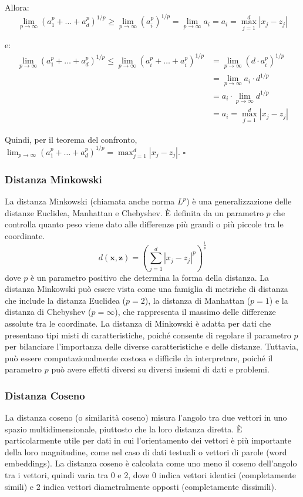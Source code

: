     Allora:
    \[
    \lim_{p \to \infty} (a^p_1 + \ldots + a^p_d)^{1/p} \geq \lim_{p \to \infty} (a^p_i)^{1/p} = \lim_{p \to \infty} a_i = a_i = \max_{j=1}^d |x_j - z_j|
    \]
    
    e:
    \begin{align*}
    \lim_{p \to \infty} (a^p_1 + \ldots + a^p_d)^{1/p} \leq \lim_{p \to \infty} (a^p_i + \ldots + a^p_i)^{1/p} &= \lim_{p \to \infty} (d \cdot a^p_i)^{1/p} \\
    &= \lim_{p \to \infty} a_i \cdot d^{1/p} \\
    &= a_i \cdot \lim_{p \to \infty} d^{1/p} \\
    &= a_i = \max_{j=1}^d |x_j - z_j|
    \end{align*}

    Quindi, per il teorema del confronto, $\lim_{p \to \infty} (a^p_1 + \ldots + a^p_d)^{1/p} = \max_{j=1}^d |x_j - z_j|$. $\square$

\subsubsection{Distanza Minkowski} La distanza Minkowski (chiamata anche norma $L^p$) è
    una generalizzazione delle distanze Euclidea, Manhattan e Chebyshev. 
    È definita da un parametro $p$ che controlla quanto peso viene dato alle differenze più 
    grandi o più piccole tra le coordinate.
    \[
    d(\mathbf{x}, \mathbf{z}) = \left( \sum_{j=1}^d |x_j - z_j|^p \right)^{\frac{1}{p}}
    \]
    dove \( p \) è un parametro positivo che determina la forma della distanza. La distanza 
    Minkowski può essere vista come una famiglia di metriche di distanza che include la 
    distanza Euclidea ($p = 2$), la distanza di Manhattan ($p = 1$) e la distanza di 
    Chebyshev ($p = \infty$), che rappresenta il massimo delle differenze assolute 
    tra le coordinate. La distanza di Minkowski è adatta per dati che presentano tipi misti 
    di caratteristiche, poiché consente di regolare il parametro $p$ per bilanciare 
    l'importanza delle diverse caratteristiche e delle distanze. Tuttavia, può essere 
    computazionalmente costosa e difficile da interpretare, poiché il parametro $p$ può 
    avere effetti diversi su diversi insiemi di dati e problemi.

\subsubsection{Distanza Coseno} La distanza coseno (o similarità coseno) misura 
    l'angolo tra due vettori in uno spazio multidimensionale, piuttosto che la loro distanza diretta. 
    È particolarmente utile per dati in cui l'orientamento dei vettori è più importante della loro 
    magnitudine, come nel caso di dati testuali o vettori di parole (word embeddings). La distanza 
    coseno è calcolata come uno meno il coseno dell'angolo tra i vettori, quindi varia tra 0 e 2, 
    dove 0 indica vettori identici (completamente simili) e 2 indica vettori diametralmente opposti 
    (completamente dissimili).

